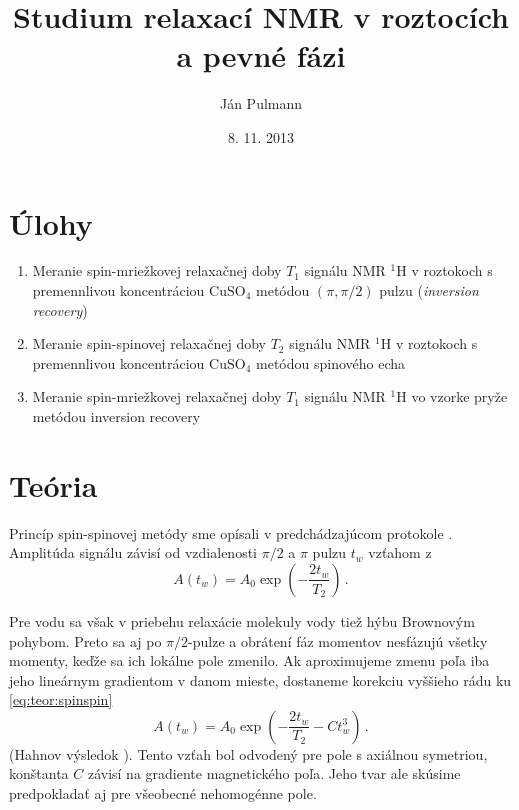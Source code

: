 \documentclass[a4paper, 10pt]{article}
\begin{document}
\title{Studium relaxací NMR v roztocích a pevné fázi}
\author{Ján Pulmann}
\date{8. 11. 2013}
\maketitle
\section*{Úlohy}
\begin{enumerate}
	\item Meranie spin-mriežkovej relaxačnej doby $T_1$ signálu NMR $^1\mathrm{H}$ v roztokoch s premennlivou koncentráciou $\mathrm {CuSO_4}$ metódou $(\pi, \pi/2)$ pulzu (\textit{inversion recovery})
	\item Meranie spin-spinovej relaxačnej doby $T_2$ signálu NMR $^1\mathrm{H}$ v roztokoch s premennlivou koncentráciou $\mathrm {CuSO_4}$ metódou spinového echa
    \item Meranie spin-mriežkovej relaxačnej doby  $T_1$ signálu NMR $^1\mathrm{H}$ vo vzorke pryže metódou inversion recovery
 \end{enumerate}

\section*{Teória}
Princíp spin-spinovej metódy sme opísali v predchádzajúcom protokole \cite{predch}. Amplitúda signálu závisí od vzdialenosti $\pi/2$ a $\pi$ pulzu $t_w$ vzťahom z \cite{studA} 
\begin{equation}
\label{eq:teor:spinspin}
A(t_w) = A_0 \exp\left(-\frac{2t_w}{T_2}\right)\,.
\end{equation}

Pre vodu sa však v priebehu relaxácie molekuly vody tiež hýbu Brownovým pohybom. Preto sa aj po $\pi/2$-pulze a obrátení fáz momentov nesfázujú všetky momenty, keďže sa ich lokálne pole zmenilo. Ak aproximujeme zmenu poľa iba jeho lineárnym gradientom v danom mieste, dostaneme korekciu vyššieho rádu ku \ref{eq:teor:spinspin}
\begin{equation}
\label{eq:teor:spinspin2}
A(t_w) = A_0 \exp{\left( -\frac{2t_w}{T_2} - C t_w^3 \right)}\,.
\end{equation}
(Hahnov výsledok \cite{rozs}). Tento vzťah bol odvodený pre pole s axiálnou symetriou, konštanta $C$ závisí na gradiente magnetického poľa. Jeho tvar ale skúsime predpokladať aj pre všeobecné nehomogénne pole.
\end{document}
